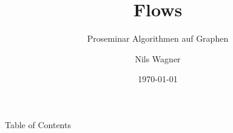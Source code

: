 \documentclass[aspectratio=169,c]{beamer} %
\title{Flows}
\subtitle{Proseminar Algorithmen auf Graphen}
\author{Nils Wagner}
\institute{RWTH Aachen University}
\date{\today}
\begin{document}
\begin{frame}[plain]
    \maketitle
\end{frame}

\begin{frame}{Table of Contents}
    \tableofcontents
\end{frame}

\end{document}
